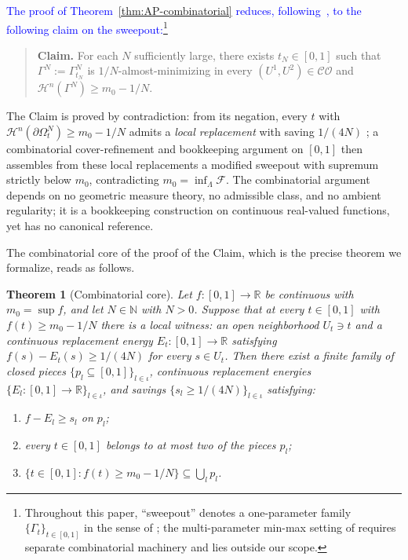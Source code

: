 \documentclass[11pt,reqno]{amsart}
\newcommand{\me}[1]{\textcolor{blue}{#1}}
\newtheorem{theorem}{Theorem}[section]
\theoremstyle{definition}
\begin{document}
\me{The proof of Theorem~\ref{thm:AP-combinatorial} reduces,
following~\cite[\S3.2]{DLT13}, to the following claim on the
sweepout:\footnote{Throughout this paper, ``sweepout'' denotes a
one-parameter family $\{\Gamma_t\}_{t \in [0,1]}$ in the sense of
\cite[Def.~3.1]{DLT13}; the multi-parameter min-max setting of
\cite{MN14} requires separate combinatorial machinery and lies
outside our scope.}}

\begin{quote}
\textbf{Claim.} For each $N$ sufficiently large, there exists
$t_N \in [0,1]$ such that $\Gamma^N := \Gamma^N_{t_N}$ is
$1/N$-almost-minimizing in every $(U^1, U^2) \in \mathcal{CO}$
and $\mathcal{H}^n(\Gamma^N) \ge m_0 - 1/N$.
\end{quote}

The Claim is proved by contradiction: from its negation, every
$t$ with $\mathcal{H}^n(\partial \Omega^N_t) \ge m_0 - 1/N$
admits a \emph{local replacement} with saving $1/(4N)$
\cite[Lemma~3.1]{DLT13}; a combinatorial cover-refinement and
bookkeeping argument on $[0,1]$ then assembles from these local
replacements a modified sweepout with supremum strictly below
$m_0$,
contradicting $m_0 = \inf_\Lambda \mathcal{F}$. The combinatorial
argument depends on no geometric measure theory, no admissible
class, and no ambient regularity; it is a bookkeeping
construction on continuous real-valued functions, yet has no
canonical reference.

The combinatorial core of the proof of the Claim, which is the
precise theorem we formalize, reads as follows.

\begin{theorem}[Combinatorial core]
\label{thm:intro-scalar}
Let $f : [0,1] \to \mathbb{R}$ be continuous with
$m_0 = \sup f$, and let $N \in \mathbb{N}$ with $N > 0$. Suppose
that at every $t \in [0,1]$ with $f(t) \ge m_0 - 1/N$ there is a
\emph{local witness}: an open neighborhood $U_t \ni t$ and a
continuous replacement energy $E_t : [0,1] \to \mathbb{R}$
satisfying $f(s) - E_t(s) \ge 1/(4N)$ for every $s \in U_t$.
Then there exist a finite family of closed pieces
$\{p_l \subseteq [0,1]\}_{l \in \iota}$, continuous replacement
energies $\{E_l : [0,1] \to \mathbb{R}\}_{l \in \iota}$, and
savings $\{s_l \ge 1/(4N)\}_{l \in \iota}$ satisfying:
\begin{enumerate}
\item[\textup{(I)}] $f - E_l \ge s_l$ on $p_l$;
\item[\textup{(II)}] every $t \in [0,1]$ belongs to at most
  two of the pieces $p_l$;
\item[\textup{(III)}] $\{t \in [0,1] : f(t) \ge m_0 - 1/N\}
  \subseteq \bigcup_l p_l$.
\end{enumerate}
\end{theorem}
\end{document}
